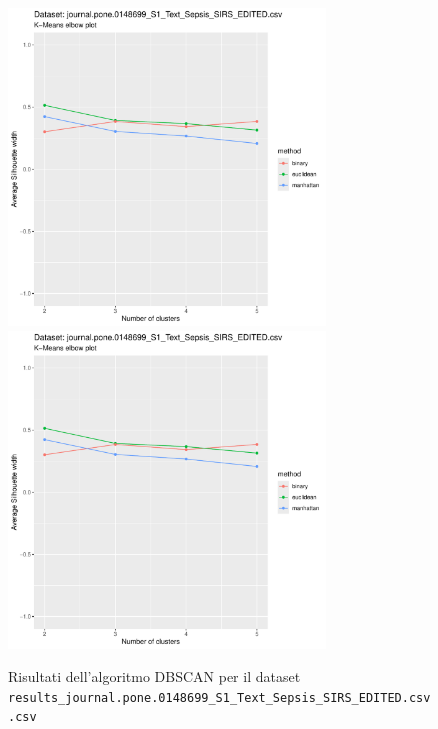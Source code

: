 \documentclass[12pt]{report}
\begin{document}
			\begin{figure}[h]
				\centering
				\includegraphics[width = 0.75\textwidth, height = 0.45\textheight, page = 5]{
					results/results_journal.pone.0148699_S1_Text_Sepsis_SIRS_EDITED.csv.pdf
				}
				\includegraphics[width = 0.75\textwidth, height = 0.45\textheight, page = 6]{
					results/results_journal.pone.0148699_S1_Text_Sepsis_SIRS_EDITED.csv.pdf
				}
				\caption{Risultati dell'algoritmo DBSCAN per il dataset
				\texttt{results\_journal.pone.0148699\_S1\_Text\_Sepsis\_SIRS\_EDITED.csv.csv}}
				\label{fig:dbscan5}
			\end{figure}
\end{document}
